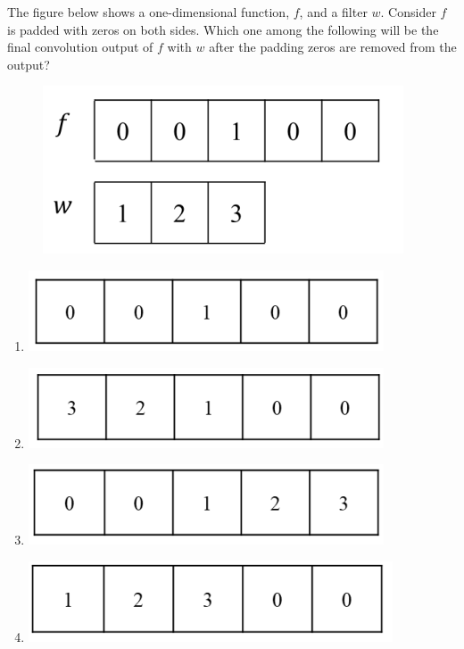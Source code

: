 \item The figure below shows a one-dimensional function, $f$, and a filter $w$. Consider $f$ is padded with zeros on both sides. Which one among the following will be the final convolution output of $f$ with $w$ after the padding zeros are removed from the output?

\hfill {}
\begin{figure}[H]
    \centering
    \includegraphics[width=0.4\columnwidth]{GATE/2025/GE/figs/fig12.png}
    \caption{}
    \label{figs:fig12}
\end{figure}
\begin{multicols}{2}
\begin{enumerate}
\item \includegraphics[width=0.8\columnwidth]{GATE/2025/GE/figs/fig15.png}
\item \includegraphics[width=0.8\columnwidth]{GATE/2025/GE/figs/fig16.png}
\item \includegraphics[width=0.8\columnwidth]{GATE/2025/GE/figs/fig17.png}
\item \includegraphics[width=0.8\columnwidth]{GATE/2025/GE/figs/fig18.png}
\end{enumerate}
\end{multicols}
